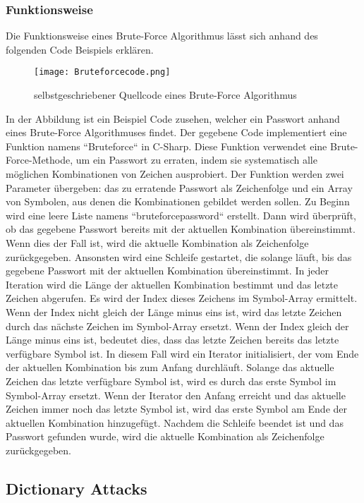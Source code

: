 \subsubsection{Funktionsweise}
Die Funktionsweise eines Brute-Force Algorithmus lässt sich anhand des folgenden Code Beispiels erklären.
\begin{figure}[H]
    \centering
      \texttt{[image: Bruteforcecode.png]}
     \caption[Quellcode des Brute-Force Algorithmus]{selbstgeschriebener Quellcode eines Brute-Force Algorithmus\protect\footnotemark}
     \label{Quellcode des Brute-Force Algorithmus}
  \end{figure}
In der Abbildung ist ein Beispiel Code zusehen, welcher ein Passwort anhand eines Brute-Force Algorithmuses findet. 
Der gegebene Code implementiert eine Funktion namens ``Bruteforce``  in C-Sharp.
Diese Funktion verwendet eine Brute-Force-Methode, um ein Passwort zu erraten, indem sie systematisch alle möglichen Kombinationen von Zeichen ausprobiert.
Der Funktion werden zwei Parameter übergeben: das zu erratende Passwort als Zeichenfolge und ein Array von Symbolen, aus denen die Kombinationen gebildet werden sollen.
Zu Beginn wird eine leere Liste namens ``bruteforcepassword`` erstellt. Dann wird überprüft, ob das gegebene Passwort bereits mit der aktuellen Kombination übereinstimmt. 
Wenn dies der Fall ist, wird die aktuelle Kombination als Zeichenfolge zurückgegeben.
Ansonsten wird eine Schleife gestartet, die solange läuft, bis das gegebene Passwort mit der aktuellen Kombination übereinstimmt. 
In jeder Iteration wird die Länge der aktuellen Kombination bestimmt und das letzte Zeichen abgerufen. 
Es wird der Index dieses Zeichens im Symbol-Array ermittelt.
Wenn der Index nicht gleich der Länge minus eins ist, wird das letzte Zeichen durch das nächste Zeichen im Symbol-Array ersetzt.
Wenn der Index gleich der Länge minus eins ist, bedeutet dies, dass das letzte Zeichen bereits das letzte verfügbare Symbol ist. 
In diesem Fall wird ein Iterator initialisiert, der vom Ende der aktuellen Kombination bis zum Anfang durchläuft. 
Solange das aktuelle Zeichen das letzte verfügbare Symbol ist, wird es durch das erste Symbol im Symbol-Array ersetzt. 
Wenn der Iterator den Anfang erreicht und das aktuelle Zeichen immer noch das letzte Symbol ist, wird das erste Symbol am Ende der aktuellen Kombination hinzugefügt.
Nachdem die Schleife beendet ist und das Passwort gefunden wurde, wird die aktuelle Kombination als Zeichenfolge zurückgegeben.
\subsection{Dictionary Attacks}
